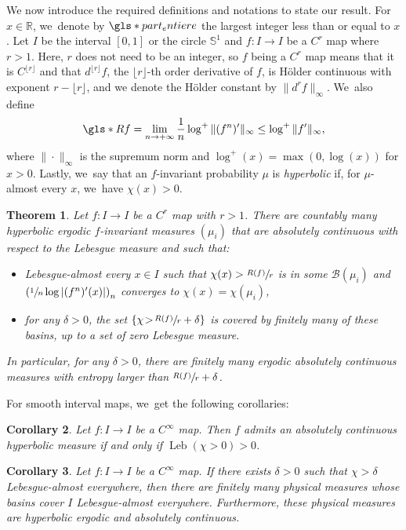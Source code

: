 \documentclass[10pt]{amsart}
\DeclareMathOperator{\Leb}{Leb}
\let\rC C
\newtheorem{thmtitle}{Theorem}
\newtheorem{cortitle}[thmtitle]{Corollary}
\theoremstyle{definition}
\newcommand{\bbR}{{\mathbb{R}}}
\newcommand{\bbS}{{\mathbb{S}}}
\begin{document}
We now introduce the required definitions and notations to state our result.
For $x \in \bbR$, we~denote by $\gls*{part_entiere}$ the largest integer less than or equal to $x$.
Let $I$ be the interval $[0, 1]$ or the circle $\bbS^1$ and $f : I \to I$ be a $\rC^r$ map where $r > 1$. Here, $r$ does not need to be an integer, so $f$ being a $\rC^r$ map means that it is $\rC^{\lfloor r \rfloor}$ and that $d^{\lfloor r \rfloor} f$, the $\lfloor r \rfloor$-th order derivative of $f$, is Hölder continuous with exponent $r - \lfloor r \rfloor$, and we denote the Hölder constant by $\| d^r f \|_{\infty}$. We~also define
\[
\gls*{Rf} = \lim_{n \to +\infty} \frac{1}{n} \log^+ \|(f^n)'\|_{\infty} \leq \log^+ \| f' \|_{\infty},
\]
where $\| \cdot \|_{\infty}$ is the supremum norm and $\log^+(x) =\max(0, \log(x))$ for $x > 0$.
Lastly, we~say that an $f$\nobreakdash-invariant probability $\mu$ is \textit{hyperbolic} if, for $\mu$-almost every $x$, we~have $\chi(x) > 0$.


\begin{thmtitle}
\label{thm:thm}
Let $f : I \to I$ be a $\rC^r$ map with $r > 1$.
There are countably many hyperbolic ergodic $f$\nobreakdash-invariant measures $(\mu_i)$ that are absolutely continuous with respect to the Lebesgue measure and such that:
\begin{itemize}
\item
Lebesgue-almost every $x \in I$ such that $\chi(x) > \sfrac{R(f)}{r}$ is in some $\mathcal{B}(\mu_i)$ and $\left (\sfrac{1}{n} \log |(f^n)'(x)| \right)_n$ converges to $\chi(x) = \chi(\mu_i)$,

\item
for any $\delta \!>\! 0$, the set $\left \{ \chi \!>\! \sfrac{R(f)}{r} + \delta \right \}$ is covered by finitely many of these basins, up to a set of zero Lebesgue measure.
\end{itemize}
In particular, for any $\delta > 0$, there are finitely many ergodic absolutely continuous measures with entropy larger than $\sfrac{R(f)}{r} + \delta$.
\end{thmtitle}


For smooth interval maps, we~get the following corollaries:

\begin{cortitle}
\label{cor:title}
Let $f : I \to I$ be a $\rC^{\infty}$ map.
Then $f$ admits an absolutely continuous hyperbolic measure if and only if $\Leb(\chi > 0) > 0$.
\end{cortitle}

\begin{cortitle}
\label{cor:title2}
Let $f : I \to I$ be a $\rC^{\infty}$ map. If there exists $\delta > 0$ such that $\chi > \delta$ Lebesgue-almost everywhere, then there are finitely many physical measures whose basins cover $I$ Lebesgue-almost everywhere.
Furthermore, these physical measures are hyperbolic ergodic and absolutely continuous.
\end{cortitle}
\end{document}
